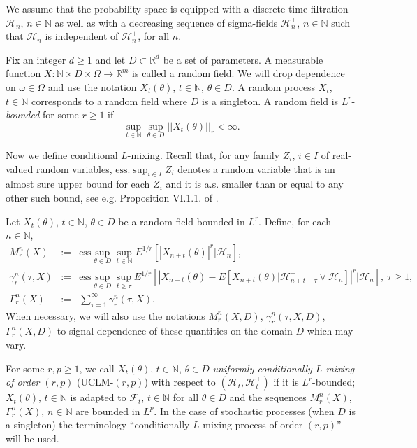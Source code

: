 \documentclass[a4paper,draft]{article}
\begin{document}
We assume that the probability space is equipped
with a discrete-time filtration $\mathcal{H}_n$, $n\in\mathbb{N}$ as well as with a decreasing sequence of sigma-fields $\mathcal{H}_n^+$, $n\in\mathbb{N}$ such that $\mathcal{H}_n$ is
independent of $\mathcal{H}_n^+$, for all $n$. 

Fix an integer $d\geq 1$ and let $D\subset \mathbb{R}^d$ be a set of parameters. A measurable function 
$X:\mathbb{N}\times D\times\Omega\to\mathbb{R}^m$ is called a random field. We will drop dependence on $\omega\in\Omega$ and
use the notation $X_t(\theta)$, $t\in\mathbb{N}$, $\theta\in D$. A random
process $X_t$, $t\in\mathbb{N}$ corresponds to a random field where $D$
is a singleton. A random field is $L^r$-\emph{bounded} for some $r\geq 1$
if
$$
\sup_{t\in\mathbb{N}}\sup_{\theta\in D} ||X_t(\theta)||_r<\infty.
$$

Now we define conditional $L$-mixing.
Recall that, for any family $Z_i$, $i\in I$ of real-valued random variables, $\mathrm{ess.}\sup_{i\in I} Z_i$
denotes a random variable that is an almost sure upper bound for each $Z_i$ and it is a.s.
smaller than or equal to any other such bound, see e.g. Proposition VI.1.1. of \cite{neveu}.


Let $X_t(\theta)$, $t\in\mathbb{N}$, $\theta\in D$ be a random field
bounded in $L^r$. 
Define, for each $n\in\mathbb{N}$,
\begin{eqnarray*}
	M^{n}_r(X) &:=& \mathrm{ess}\sup_{\theta\in D}\sup_{t \in\mathbb{N}} 
	E^{1/r}[|X_{n+t}(\theta)|^r\big\vert\mathcal{H}_n],\\
	\gamma^{n}_r(\tau,X)&:=& \mathrm{ess}\sup_{\theta\in D}\sup_{t\geq\tau} 
	E^{1/r}[|X_{n+t}(\theta)-E[X_{n+t}(\theta)\vert \mathcal{H}_{n+t-\tau}^+\vee \mathcal{H}_n]|^r\big\vert
	\mathcal{H}_n],\ \tau\geq 1,\\
	\Gamma^{n}_r(X) &:=&\sum_{\tau= 1}^{\infty}\gamma^{n}_r(\tau,X).
\end{eqnarray*}
When necessary, we will also use the notations $M^{n}_r(X,D)$, 
$\gamma^{n}_r(\tau,X,D)$, $\Gamma^{n}_r(X,D)$ to signal dependence of
these quantities on the domain $D$ which may vary.

For some $r,p\geq 1$, we call $X_t(\theta)$, $t\in\mathbb{N}$, $\theta\in D$
\emph{uniformly {conditionally} $L$-mixing of order $(r,p)$} (UCLM-$(r,p)$) 
with respect to $(\mathcal{H}_t,\mathcal{H}_t^+)$ if 
it is $L^r$-bounded; $X_t(\theta)$, $t\in\mathbb{N}$ is adapted to 
$\mathcal{F}_t$, $t\in\mathbb{N}$ 
for all $\theta\in D$ 
and the sequences  $M^n_r(X)$, $\Gamma^n_r(X)$, $n\in\mathbb{N}$
are bounded in $L^p$. In the case of stochastic processes (when $D$ is a singleton)
the terminology ``conditionally $L$-mixing process of order $(r,p)$'' will be used. 
\end{document}
